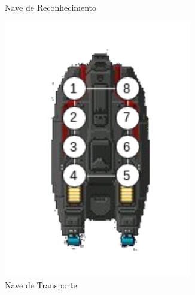 \begin{figure}[ht]
\begin{subfigure}[b]{0.24\textwidth}
		\caption{Nave de Reconhecimento}
		\label{fig:nave_rec}
	\end{subfigure}
	\begin{subfigure}[b]{0.24\textwidth}
		\centering
		\includegraphics[width=0.9\textwidth]{imgs/trans.png}
		\caption{Nave de Transporte}
		\label{fig:nave_transp}
	\end{subfigure}
	\begin{subfigure}[b]{0.24\textwidth}
		\centering

\end{subfigure}
\end{figure}

